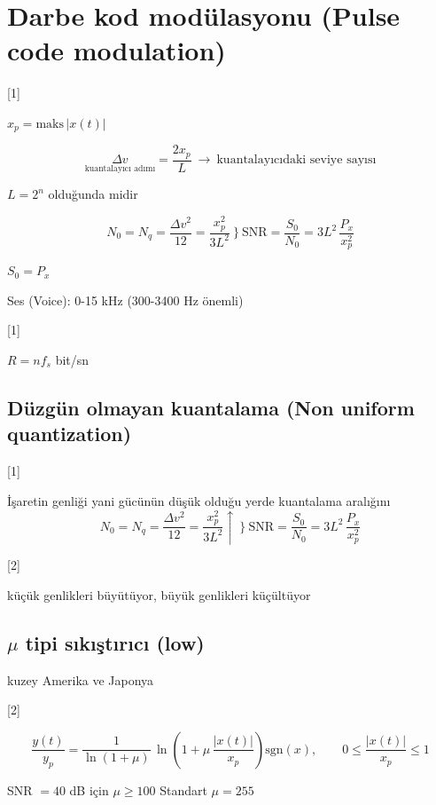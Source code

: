 \documentclass[11pt,a4paper]{article}
\begin{document}

\section{Darbe kod modülasyonu (Pulse code modulation)}

[1]

$x_p=\mathrm{maks}\,|x(t)|$

\[ \underset{\text{kuantalayıcı adımı}}{\Delta v}=\frac{2x_p}{L}\ \longrightarrow\ \text{kuantalayıcıdaki seviye sayısı} \]

$L=2^n$ olduğunda midir

\[ N_0=N_q=\frac{\Delta v^2}{12}=\frac{x_p^2}{3L^2}\ \Big\}\ \mathrm{SNR}=\frac{S_0}{N_0}=3L^2\,\frac{P_x}{x_p^2} \]

$S_0=P_x$

Ses (Voice): 0-15 kHz \quad (300-3400 Hz önemli)

[1]

$R=nf_s$ bit/sn

\subsection{Düzgün olmayan kuantalama (Non uniform quantization)}

[1]

İşaretin genliği yani gücünün düşük olduğu yerde kuantalama aralığını 
\[ N_0=N_q=\frac{\Delta v^2}{12}=\frac{x_p^2}{3L^2}\uparrow\ \Big\}\ \mathrm{SNR}=\frac{S_0}{N_0}=3L^2\,\frac{P_x}{x_p^2} \]

[2]

küçük genlikleri büyütüyor, büyük genlikleri küçültüyor

\subsection{$\mu$ tipi sıkıştırıcı (low)}
kuzey Amerika ve Japonya

[2]

\[ \frac{y(t)}{y_p}=\frac{1}{\ln(1+\mu)}\,\ln\!\left(1+\mu\,\frac{|x(t)|}{x_p}\right)\mathrm{sgn}(x),\qquad 0\le\frac{|x(t)|}{x_p}\le 1 \]

SNR $=40$ dB için $\mu\ge 100$ \hfill Standart $\mu=255$
\end{document}

